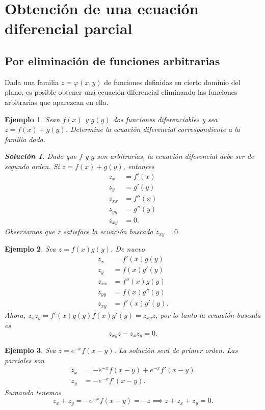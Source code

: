 \documentclass[11pt,letterpaper,draft]{report}
\newtheorem{example}{Ejemplo}[section]
\newtheorem*{sol}{Solución}
\newcommand\<{\langle}
\renewcommand\>{\rangle}
\renewcommand\phi\varphi
\begin{document}
\section{Obtención de una ecuación diferencial parcial}

\subsection{Por eliminación de funciones arbitrarias}

Dada una familia $z = \phi(x,y)$ de funciones definidas en
cierto dominio del plano, es posible obtener una ecuación
diferencial eliminando las funciones arbitrarias que
aparezcan en ella.

\begin{example}
  Sean $f(x)$ y $g(y)$ dos funciones diferenciables y sea $z
  = f(x) + g(y)$. Determine la ecuación diferencial
  correspondiente a la familia dada.

  \begin{sol}
    Dado que $f$ y $g$ son arbitrarias, la ecuación
    diferencial debe ser de segundo orden. Si $z = f(x) +
    g(y)$, entonces
     \begin{align*}
       z_x &= f'(x)\\
       z_y &= g'(y)\\
       z_{xx} &= f''(x)\\
       z_{yy} &= g''(y)\\
       z_{xy} &= 0.
    \end{align*} Observamos que $z$ satisface la ecuación
    buscada $z_{xy} = 0$.
  \end{sol}
\end{example}

\begin{example}
  Sea $z = f(x)g(y)$. De nuevo
  \begin{align*}
    z_x &= f'(x)g(y)\\
    z_y &= f(x)g'(y)\\
    z_{xx} &= f''(x)g(y)\\
    z_{yy} &= f(x)g''(y)\\
    z_{xy} &= f'(x)g'(y).
  \end{align*}
  Ahora, $z_x z_y = f'(x)g(y)f(x)g'(y) = z_{xy} z$, por lo
  tanto la ecuación buscada es
  \[
    z_{xy} z - z_x z_y = 0.
  \] 
\end{example}

\begin{example}
  Sea $z = e^{-x} f(x-y)$. La solución será de primer orden.
  Las parciales son
  \begin{align*}
    z_x &= -e^{-x} f(x-y) + e^{-x} f'(x-y)\\
    z_y &= -e^{-x} f'(x-y).
  \end{align*} Sumando tenemos
  \[
    z_x + z_y = -e^{-x} f(x-y) = -z \implies z + z_x + z_y =
    0.
  \] 
\end{example}
\end{document}

